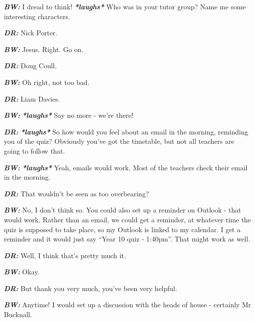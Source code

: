 \textit{\textbf{BW:}} I dread to think! \textit{\textbf{*laughs*}} Who was in your tutor group? Name me some interesting characters.

\textit{\textbf{DR:}} Nick Porter.

\textit{\textbf{BW:}} Jesus. Right. Go on.

\textit{\textbf{DR:}} Doug Coull.

\textit{\textbf{BW:}} Oh right, not too bad.

\textit{\textbf{DR:}} Liam Davies.

\textit{\textbf{BW:}} \textit{\textbf{*laughs*}} Say no more - we're there!

\textit{\textbf{DR:}} \textit{\textbf{*laughs*}} So how would you feel about an email in the morning, reminding you of the quiz? Obviously you've got the timetable, but not all teachers are going to follow that.

\textit{\textbf{BW:}} \textit{\textbf{*laughs*}} Yeah, emails would work. Most of the teachers check their email in the morning.

\textit{\textbf{DR:}} That wouldn't be seen as too overbearing?

\textit{\textbf{BW:}} No, I don't think so. You could also set up a reminder on Outlook - that would work. Rather than an email, we could get a reminder, at whatever time the quiz is supposed to take place, so my Outlook is linked to my calendar. I get a reminder and it would just say ``Year 10 quiz - 1:40pm''. That might work as well.

\textit{\textbf{DR:}} Well, I think that's pretty much it.

\textit{\textbf{BW:}} Okay.

\textit{\textbf{DR:}} But thank you very much, you've been very helpful.

\textit{\textbf{BW:}} Anytime! I would set up a discussion with the heads of house - certainly Mr Bucknall.